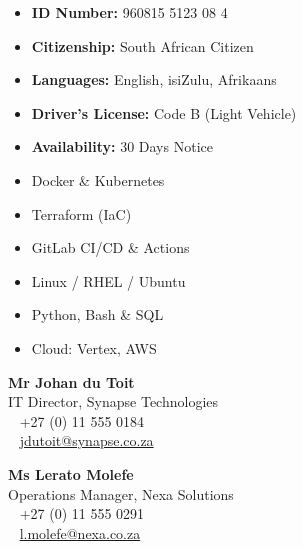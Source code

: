 \documentclass[10pt,a4paper]{article}
\begin{document}
\begin{minipage}[t]{0.39\textwidth}
    \begin{tcolorbox}[colback=lightbg, colframe=lightbg, arc=1.5mm, boxrule=0pt, top=8pt, bottom=8pt, left=8pt, right=8pt]
        {\large\bfseries\color{primary}{Personal Details}} \par\smallskip
        \begin{itemize}[label={}, leftmargin=0pt, itemsep=3pt]
            \item \textbf{ID Number:} 960815 5123 08 4
            \item \textbf{Citizenship:} South African Citizen
            \item \textbf{Languages:} English, isiZulu, Afrikaans
            \item \textbf{Driver's License:} Code B (Light Vehicle)
            \item \textbf{Availability:} 30 Days Notice
        \end{itemize}
        
        \vspace{0.3cm}
        {\large\bfseries\color{primary}{Technical Expertise}} \par\smallskip
        \begin{itemize}[leftmargin=10pt, itemsep=2.5pt]
            \item Docker \& Kubernetes
            \item Terraform (IaC)
            \item GitLab CI/CD \& Actions
            \item Linux / RHEL / Ubuntu
            \item Python, Bash \& SQL
            \item Cloud: Vertex, AWS
        \end{itemize}
        
        \vspace{0.3cm}
        {\large\bfseries\color{primary}{Contactable References}} \par\smallskip
        \textbf{Mr Johan du Toit} \\
        {\small IT Director, Synapse Technologies} \\
        \faPhone ~ +27 (0) 11 555 0184 \\
        \faEnvelope ~ \href{mailto:jdutoit@synapse.co.za}{\scriptsize jdutoit@synapse.co.za}
        
        \vspace{0.25cm}
        \textbf{Ms Lerato Molefe} \\
        {\small Operations Manager, Nexa Solutions} \\
        \faPhone ~ +27 (0) 11 555 0291 \\
        \faEnvelope ~ \href{mailto:l.molefe@nexa.co.za}{\scriptsize l.molefe@nexa.co.za}
    \end{tcolorbox}
\end{minipage}
\end{document}
